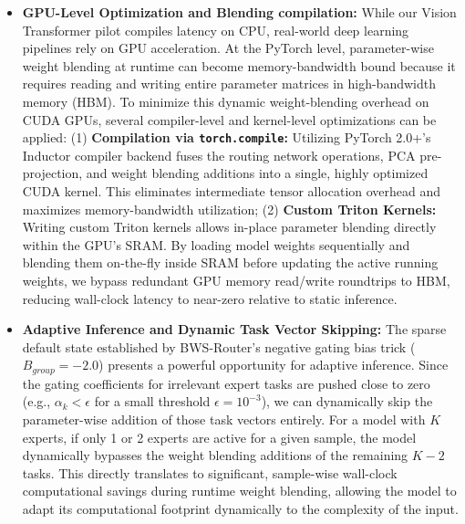 \begin{itemize}
    \item \textbf{GPU-Level Optimization and Blending compilation:} While our Vision Transformer pilot compiles latency on CPU, real-world deep learning pipelines rely on GPU acceleration. At the PyTorch level, parameter-wise weight blending at runtime can become memory-bandwidth bound because it requires reading and writing entire parameter matrices in high-bandwidth memory (HBM). To minimize this dynamic weight-blending overhead on CUDA GPUs, several compiler-level and kernel-level optimizations can be applied: (1) \textbf{Compilation via \texttt{torch.compile}:} Utilizing PyTorch 2.0+'s Inductor compiler backend fuses the routing network operations, PCA pre-projection, and weight blending additions into a single, highly optimized CUDA kernel. This eliminates intermediate tensor allocation overhead and maximizes memory-bandwidth utilization; (2) \textbf{Custom Triton Kernels:} Writing custom Triton kernels allows in-place parameter blending directly within the GPU's SRAM. By loading model weights sequentially and blending them on-the-fly inside SRAM before updating the active running weights, we bypass redundant GPU memory read/write roundtrips to HBM, reducing wall-clock latency to near-zero relative to static inference.
    \item \textbf{Adaptive Inference and Dynamic Task Vector Skipping:} The sparse default state established by BWS-Router's negative gating bias trick ($B_{group} = -2.0$) presents a powerful opportunity for adaptive inference. Since the gating coefficients for irrelevant expert tasks are pushed close to zero (e.g., $\alpha_{k} < \epsilon$ for a small threshold $\epsilon = 10^{-3}$), we can dynamically skip the parameter-wise addition of those task vectors entirely. For a model with $K$ experts, if only 1 or 2 experts are active for a given sample, the model dynamically bypasses the weight blending additions of the remaining $K-2$ tasks. This directly translates to significant, sample-wise wall-clock computational savings during runtime weight blending, allowing the model to adapt its computational footprint dynamically to the complexity of the input.

\end{itemize}

